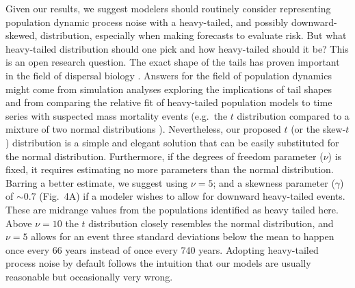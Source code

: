 \documentclass[9pt,twocolumn,twoside]{pnas-new}
\begin{document}


Given our results, we suggest modelers should routinely consider representing population dynamic
process noise with a heavy-tailed, and possibly downward-skewed, distribution,
especially when making forecasts to evaluate risk.
But what heavy-tailed distribution should one pick
and how heavy-tailed should it be?
This is an open research question.
The exact shape of the tails has proven important
in the field of dispersal biology \cite{kot1996, clark1999}.
Answers for the field of population dynamics
might come from simulation analyses exploring
the implications of tail shapes and
from comparing the relative fit of heavy-tailed
population models to time series
with suspected mass mortality events
(e.g.~the $t$ distribution compared to a mixture
of two normal distributions \cite{ward2007}).
Nevertheless, our proposed $t$ (or the skew-$t$) distribution
is a simple and elegant solution that
can be easily substituted for the normal distribution.
Furthermore, if the degrees of freedom parameter ($\nu$)
is fixed,
it requires estimating no more parameters
than the normal distribution.
Barring a better estimate,
we suggest using $\nu = 5$; and
a skewness parameter ($\gamma$) of $\sim 0.7$ (Fig.~4A)
if a modeler wishes to allow for downward heavy-tailed events.
These are midrange values from the populations identified as heavy tailed here.
Above $\nu  =  10$ the $t$ distribution closely resembles
the normal distribution,
and $\nu  = 5$ allows for an event
three standard deviations below the mean to happen
once every 66 years instead of once every 740 years.
Adopting heavy-tailed process noise by default follows the intuition
that our models are usually reasonable but occasionally very wrong.
\end{document}
